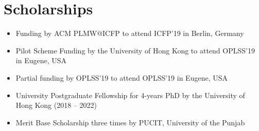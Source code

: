 \section{Scholarships}

\begin{itemize}
    \item[\ding{118}] Funding by ACM PLMW@ICFP to attend ICFP’19 in Berlin, Germany
    \item[\ding{118}] Pilot Scheme Funding by the University of Hong Kong to attend OPLSS’19 in Eugene, USA
    \item[\ding{118}] Partial funding by OPLSS’19 to attend OPLSS’19 in Eugene, USA
    \item[\ding{118}] University Postgraduate Fellowship for 4-years PhD by the University of Hong Kong (2018 – 2022)
    \item[\ding{118}] Merit Base Scholarship three times by PUCIT, University of the Punjab
\end{itemize}
